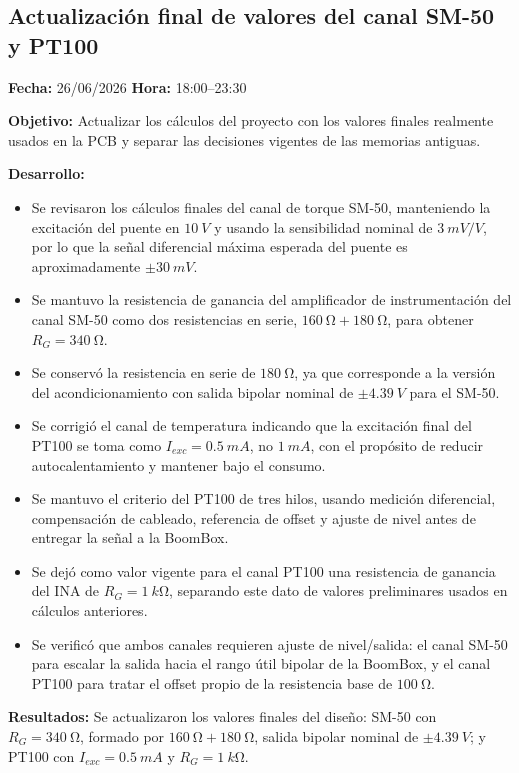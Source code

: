 \documentclass[12pt]{article}
\begin{document}
\subsection{Actualización final de valores del canal SM-50 y PT100}
\textbf{Fecha:} 26/06/2026 \quad \textbf{Hora:} 18:00--23:30

\textbf{Objetivo:}
Actualizar los cálculos del proyecto con los valores finales realmente usados en la PCB y separar las decisiones vigentes de las memorias antiguas.

\textbf{Desarrollo:}
\begin{itemize}
\item Se revisaron los cálculos finales del canal de torque SM-50, manteniendo la excitación del puente en \(\SI{10}{V}\) y usando la sensibilidad nominal de \(\SI{3}{mV/V}\), por lo que la señal diferencial máxima esperada del puente es aproximadamente \(\pm\SI{30}{mV}\).
\item Se mantuvo la resistencia de ganancia del amplificador de instrumentación del canal SM-50 como dos resistencias en serie, \(\SI{160}{\ohm}+\SI{180}{\ohm}\), para obtener \(R_G=\SI{340}{\ohm}\).
\item Se conservó la resistencia en serie de \(\SI{180}{\ohm}\), ya que corresponde a la versión del acondicionamiento con salida bipolar nominal de \(\pm\SI{4.39}{V}\) para el SM-50.
\item Se corrigió el canal de temperatura indicando que la excitación final del PT100 se toma como \(I_{exc}=\SI{0.5}{mA}\), no \(\SI{1}{mA}\), con el propósito de reducir autocalentamiento y mantener bajo el consumo.
\item Se mantuvo el criterio del PT100 de tres hilos, usando medición diferencial, compensación de cableado, referencia de offset y ajuste de nivel antes de entregar la señal a la BoomBox.
\item Se dejó como valor vigente para el canal PT100 una resistencia de ganancia del INA de \(R_G=\SI{1}{k\ohm}\), separando este dato de valores preliminares usados en cálculos anteriores.
\item Se verificó que ambos canales requieren ajuste de nivel/salida: el canal SM-50 para escalar la salida hacia el rango útil bipolar de la BoomBox, y el canal PT100 para tratar el offset propio de la resistencia base de \(\SI{100}{\ohm}\).
\end{itemize}

\textbf{Resultados:}
Se actualizaron los valores finales del diseño: SM-50 con \(R_G=\SI{340}{\ohm}\), formado por \(\SI{160}{\ohm}+\SI{180}{\ohm}\), salida bipolar nominal de \(\pm\SI{4.39}{V}\); y PT100 con \(I_{exc}=\SI{0.5}{mA}\) y \(R_G=\SI{1}{k\ohm}\).
\end{document}
